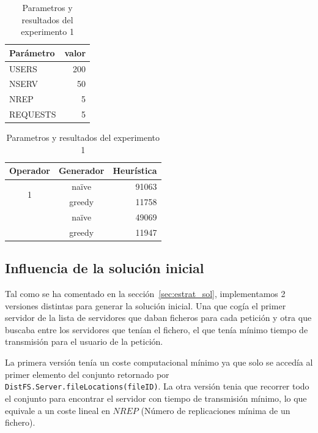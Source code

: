 \begin{table}[H]
    \caption{Parametros y resultados del experimento 1}%
    \label{tab:ex1}
    \begin{center}
    \begin{tabular}{lr}
    \toprule
    Parámetro & valor \\
    \midrule
    USERS & 200 \\
    NSERV & 50 \\
    NREP & 5 \\
    REQUESTS & 5\\
    \bottomrule
    \end{tabular}
    \hspace{2em}
    \begin{tabular}{ccr}
    \toprule
    Operador & Generador & Heurística \\
    \midrule
    \multirow{2}{*}{1} & naïve &  91063\\
    {} & greedy & 11758 \\
    \addlinespace[0.5em]
    \multirow{2}{*}{2} & naïve &  49069\\
    {} & greedy & 11947 \\
    \bottomrule
    \end{tabular}
    \end{center}
\end{table}


\subsection{Influencia de la solución inicial}


Tal como se ha comentado en la sección~\ref{sec:estrat_sol}, implementamos 2 versiones distintas
para generar la solución inicial. Una que cogía el primer servidor de la lista de servidores que daban ficheros
para cada petición y otra que buscaba entre los servidores que tenían el fichero, el que tenía mínimo
tiempo de transmisión para el usuario de la petición.

La primera versión tenía un coste computacional mínimo ya que solo se accedía al primer elemento del
conjunto retornado por \texttt{DistFS.Server.fileLocations(fileID)}. La otra versión tenia que recorrer
todo el conjunto para encontrar el servidor con tiempo de transmisión mínimo, lo que equivale a un coste
lineal en $NREP$ (Número de replicaciones mínima de un fichero).

